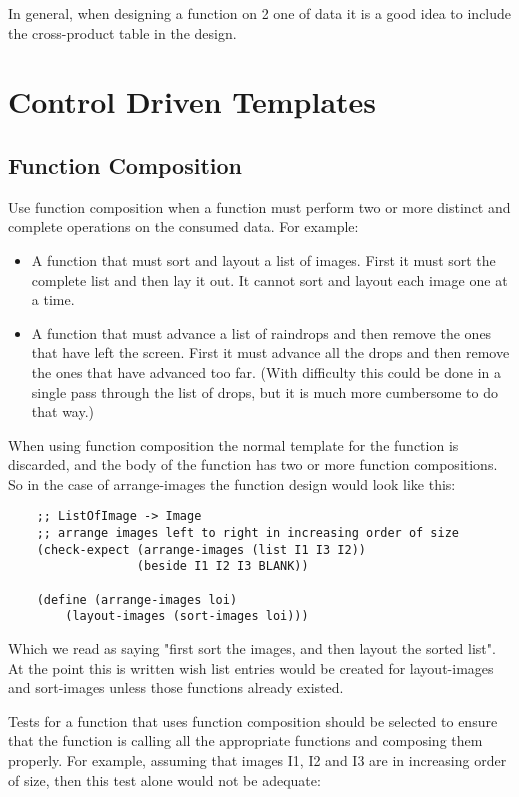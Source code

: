\documentclass[11pt,a4paper]{report}
\begin{document}
	In general, when designing a function on 2 one of data it is a good idea to include the cross-product table in the design.
	
	\chapter{Control Driven Templates}
	\section{Function Composition} \label{sec:fun_comp}
	Use function composition when a function must perform two or more distinct and complete
	operations on the consumed data. For example:
	\begin{itemize}
		\item A function that must sort and layout a list of images. First it must sort the complete list and then
		lay it out. It cannot sort and layout each image one at a time.
		\item A function that must advance a list of raindrops and then remove the ones that have left the
		screen. First it must advance all the drops and then remove the ones that have advanced too
		far. (With difficulty this could be done in a single pass through the list of drops, but it is much
		more cumbersome to do that way.)
	\end{itemize}

	When using function composition the normal template for the function is discarded, and the body
	of the function has two or more function compositions. So in the case of arrange-images the
	function design would look like this:
	
	\begin{verbatim}
	;; ListOfImage -> Image
	;; arrange images left to right in increasing order of size
	(check-expect (arrange-images (list I1 I3 I2))
	              (beside I1 I2 I3 BLANK))
	
	(define (arrange-images loi)
		(layout-images (sort-images loi)))
	\end{verbatim}
	
	Which we read as saying "first sort the images, and then layout the sorted list". At the point this is
	written wish list entries would be created for layout-images and sort-images unless those
	functions already existed.
	
	Tests for a function that uses function composition should be selected to ensure that the function
	is calling all the appropriate functions and composing them properly. For example, assuming that
	images I1, I2 and I3 are in increasing order of size, then this test alone would not be adequate:
	
\end{document}
